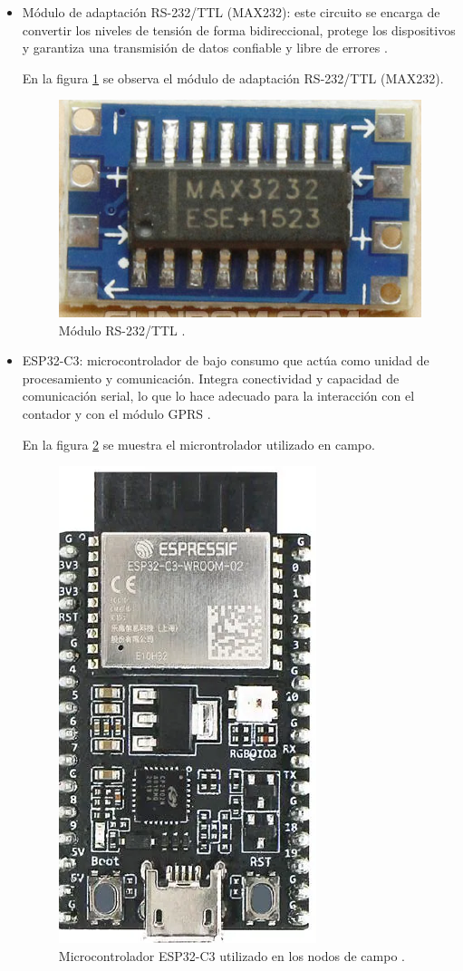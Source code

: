 \begin{itemize}
 \item Módulo de adaptación RS-232/TTL (MAX232): este circuito se encarga de convertir los niveles de tensión de forma bidireccional, protege los dispositivos y garantiza una transmisión de datos confiable y libre de errores \cite{max232}.
 
  En la figura \ref{fig:foto_max232} se observa el módulo de adaptación RS-232/TTL (MAX232).


\begin{figure}[H]
  \centering
  \includegraphics[width=0.4\linewidth]{./Figures/fotoMax232.png}
  \caption{Módulo RS-232/TTL \protect\footnotemark.}
  \label{fig:foto_max232}
\end{figure}

     


\item ESP32-C3: microcontrolador de bajo consumo que actúa como unidad de procesamiento y comunicación. Integra conectividad y capacidad de comunicación serial, lo que lo hace adecuado para la interacción con el contador y con el módulo GPRS \cite{esp32c3IDF}.

En la figura \ref{fig:esp32} se muestra el microntrolador utilizado en campo.

\begin{figure}[H]
  \centering
  \includegraphics[width=0.30\linewidth]{./Figures/fotoEsp32c3.png}
  \caption{Microcontrolador ESP32-C3 utilizado en los nodos de campo \protect\footnotemark.}
  \label{fig:esp32}
\end{figure}


\end{itemize}
